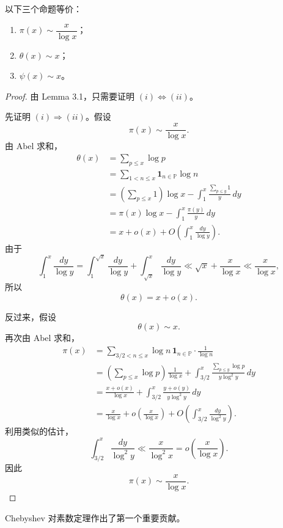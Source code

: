 \begin{theorem}[原文 Theorem 3.2]
	以下三个命题等价：
	\begin{enumerate}[label=(\roman*)]
		\item $\pi(x)\sim \dfrac{x}{\log x}$；
		\item $\theta(x)\sim x$；
		\item $\psi(x)\sim x$。
	\end{enumerate}
\end{theorem}

\begin{proof}
	由 Lemma 3.1，只需要证明 $(i)\Longleftrightarrow(ii)$。

	先证明 $(i)\Rightarrow(ii)$。假设
	\[
		\pi(x)\sim \frac{x}{\log x}.
	\]
	由 Abel 求和，
	\[
	\begin{aligned}
		\theta(x)
		&=
		\sum_{p\leq x}\log p \\
		&=
		\sum_{1<n\leq x}\mathbf 1_{n\in\mathbb P}\log n \\
		&=
		\left(\sum_{p\leq x}1\right)\log x
		-
		\int_1^x
		\frac{\sum_{p\leq y}1}{y}\,dy \\
		&=
		\pi(x)\log x-\int_1^x\frac{\pi(y)}y\,dy \\
		&=
		x+o(x)+
		O\left(\int_1^x\frac{dy}{\log y}\right).
	\end{aligned}
	\]
	由于
	\[
		\int_1^x\frac{dy}{\log y}
		=
		\int_1^{\sqrt{x}}\frac{dy}{\log y}
		+
		\int_{\sqrt{x}}^x\frac{dy}{\log y}
		\ll
		\sqrt{x}+\frac{x}{\log x}
		\ll
		\frac{x}{\log x},
	\]
	所以
	\[
		\theta(x)=x+o(x).
	\]

	反过来，假设
	\[
		\theta(x)\sim x.
	\]
	再次由 Abel 求和，
	\[
	\begin{aligned}
		\pi(x)
		&=
		\sum_{3/2<n\leq x}\log n\,\mathbf 1_{n\in\mathbb P}\cdot \frac1{\log n} \\
		&=
		\left(\sum_{p\leq x}\log p\right)\frac1{\log x}
		+
		\int_{3/2}^{x}
		\frac{\sum_{p\leq y}\log p}{y\log^2 y}\,dy \\
		&=
		\frac{x+o(x)}{\log x}
		+
		\int_{3/2}^{x}\frac{y+o(y)}{y\log^2 y}\,dy \\
		&=
		\frac{x}{\log x}+o\left(\frac{x}{\log x}\right)
		+
		O\left(\int_{3/2}^{x}\frac{dy}{\log^2 y}\right).
	\end{aligned}
	\]
	利用类似的估计，
	\[
		\int_{3/2}^{x}\frac{dy}{\log^2 y}
		\ll
		\frac{x}{\log^2 x}
		=
		o\left(\frac{x}{\log x}\right).
	\]
	因此
	\[
		\pi(x)\sim \frac{x}{\log x}.
	\]
\end{proof}

Chebyshev 对素数定理作出了第一个重要贡献。

